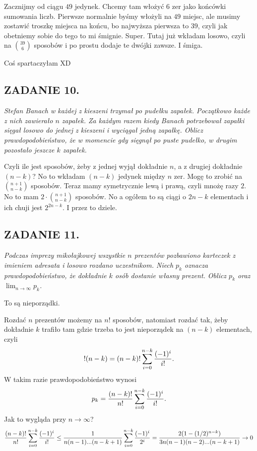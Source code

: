 \documentclass{article}
\begin{document}
Zacznijmy od ciągu $49$ jedynek. Chcemy tam włożyć $6$ zer jako końcówki sumowania liczb. Pierwsze normalnie byśmy włożyli na $49$ miejsc, ale musimy zostawić troszkę miejsca na końcu, bo najwyższa pierwsza to $39$, czyli jak obetniemy sobie do tego to mi śmignie. Super. Tutaj już wkładam losowo, czyli na ${39\choose 6}$ sposobów i po prostu dodaje te dwójki zawsze. I śmiga.

{\color{green}Coś spartaczyłam XD}

\subsection*{ZADANIE 10.}
\emph{Stefan Banach w każdej z kieszeni trzymał po pudełku zapałek. Początkowo każde z nich zawierało $n$ zapałek. Za każdym razem kiedy Banach potrzebował zapałki sięgał losowo do jednej z kieszeni i wyciągał jedną zapałkę. Oblicz prawdopodobieństwo, że w momencie gdy sięgnął po puste pudełko, w drugim pozostało jeszcze $k$ zapałek.}
\smallskip

Czyli ile jest sposobów, żeby z jednej wyjął dokładnie $n$, a z drugiej dokładnie $(n-k)$? No to wkładam $(n-k)$ jedynek między $n$ zer. Mogę to zrobić na ${n+1\choose n-k}$ sposobów. Teraz mamy symetrycznie lewą i prawą, czyli mnożę razy $2$. No to mam $2\cdot{n+1\choose n-k}$ sposobów. No a ogółem to są ciągi o $2n-k$ elementach i ich chuji jest $2^{2n-k}$. I przez to dziele.

\subsection*{ZADANIE 11.}
\emph{Podczas imprezy mikołajkowej wszystkie $n$ prezentów pozbawiono karteczek z imieniem adresata i losowo rozdano uczestnikom. Niech $p_k$ oznacza prawdopodobieństwo, że dokładnie $k$ osób dostanie własny prezent. Oblicz $p_k$ oraz $\lim_{n\to\infty}p_k$.}
\smallskip

To są nieporządki.

Rozdać $n$ prezentów możemy na $n!$ sposobów, natomiast rozdać tak, żeby dokładnie $k$ trafiło tam gdzie trzeba to jest nieporządek na $(n-k)$ elementach, czyli
$$!(n-k)=(n-k)!\sum\limits_{i=0}^{n-k}{(-1)^i\over i!}.$$
W takim razie prawdopodobieństwo wynosi
$$p_k={(n-k)!\over n!}\sum\limits_{i=0}^{n-k}{(-1)^i\over i!}.$$
Jak to wygląda przy $n\to\infty$?
$${(n-k)!\over n!}\sum\limits_{i=0}^{n-k}{(-1)^i\over i!}\leq {1\over n(n-1)...(n-k+1)}\sum\limits_{i=0}^{n-k}{(-1)^i\over 2^i}={2(1-(1/2)^{n-k})\over 3n(n-1)(n-2)...(n-k+1)}\to 0$$
\end{document}

